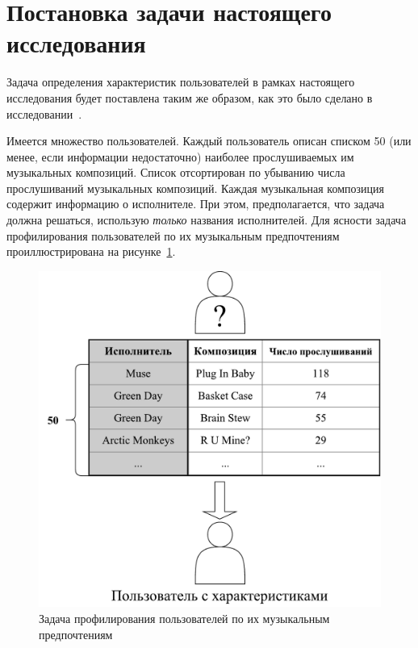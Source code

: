 \section{Постановка задачи настоящего исследования}
\label{sec:problem_formulation}

Задача определения характеристик пользователей в рамках настоящего
исследования будет поставлена таким же образом, как это было
сделано в исследовании~\cite{wu2014gender}.

Имеется множество пользователей. Каждый пользователь описан списком 50
(или менее, если информации недостаточно) наиболее прослушиваемых им
музыкальных композиций. Список отсортирован по убыванию числа
прослушиваний музыкальных композиций. Каждая музыкальная композиция
содержит информацию о исполнителе. При этом, предполагается, что задача
должна решаться, использую \textit{только} названия исполнителей. Для ясности
задача профилирования пользователей по их музыкальным предпочтениям
проиллюстрирована на рисунке~\ref{fig:problem_illustration}.

\begin{figure}[!h]
\caption{Задача профилирования пользователей
         по их музыкальным предпочтениям}
\label{fig:problem_illustration}
\centering
\includegraphics[width=\textwidth]{figs/problem-illustration.pdf}
\end{figure}

